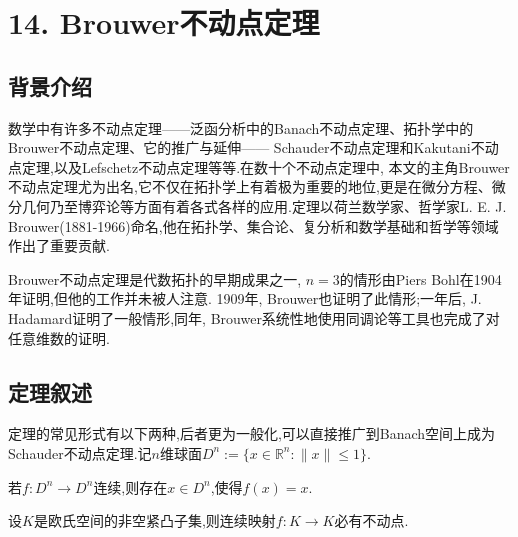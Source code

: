 \documentclass[main]{subfiles}
\newcommand{\mr}{\mathbb{R}}
\renewcommand{\leq}{\leqslant}
\begin{document}
\renewcommand{\filename}{14. Brouwer不动点定理}%
\section*{14. Brouwer不动点定理}
\subsection*{背景介绍}
数学中有许多不动点定理——泛函分析中的Banach不动点定理、拓扑学中的Brouwer不动点定理、它的推广与延伸—— Schauder不动点定理和Kakutani不动点定理,以及Lefschetz不动点定理等等.在数十个不动点定理中, 本文的主角Brouwer不动点定理尤为出名,它不仅在拓扑学上有着极为重要的地位,更是在微分方程、微分几何乃至博弈论等方面有着各式各样的应用.定理以荷兰数学家、哲学家L. E. J. Brouwer(1881-1966)命名,他在拓扑学、集合论、复分析和数学基础和哲学等领域作出了重要贡献.

Brouwer不动点定理是代数拓扑的早期成果之一, $n=3$的情形由Piers Bohl在1904年证明,但他的工作并未被人注意. 1909年, Brouwer也证明了此情形;一年后, J. Hadamard证明了一般情形,同年, Brouwer系统性地使用同调论等工具也完成了对任意维数的证明.
\subsection*{定理叙述}
定理的常见形式有以下两种,后者更为一般化,可以直接推广到Banach空间上成为Schauder不动点定理.记$n$维球面$D^n:=\{x\in\mr^n:\|x\|\leq1\}$.
\begin{theorem}\label{thm:1}
若$f:D^n\to D^n$连续,则存在$x\in D^n$,使得$f(x)=x$.
\end{theorem}
\begin{theorem}\label{thm:2}
设$K$是欧氏空间的非空紧凸子集,则连续映射$f:K\to K$必有不动点.
\end{theorem}
\end{document}
